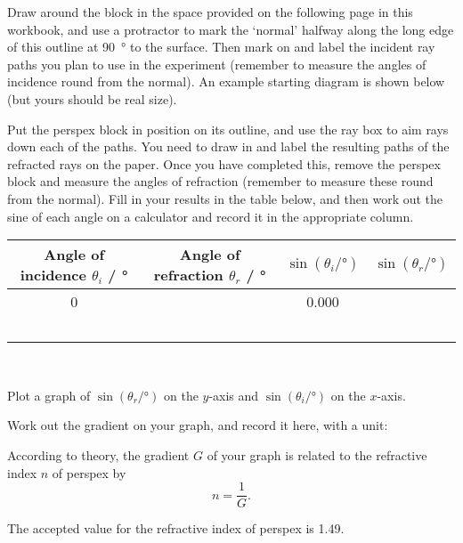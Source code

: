\begin{questions}
\question Draw around the block in the space provided on the following page in this workbook, and use a protractor to mark the `normal' halfway along the long edge of this outline at \SI{90}{\degree} to the surface.  Then mark on and label the incident ray paths you plan to use in the experiment (remember to measure the angles of incidence round from the normal).  An example starting diagram is shown below (but yours should be real size).

\hfill{}\hfill{}

\question Put the perspex block in position on its outline, and use the ray box to aim rays down each of the paths.  You need to draw in and label the resulting paths of the refracted rays on the paper.  Once you have completed this, remove the perspex block and measure the angles of refraction (remember to measure these round from the normal).  Fill in your results in the table below, and then work out the sine of each angle on a calculator and record it in the appropriate column.\\

\begin{tabular}{|c|c|c|c|}
\hline
Angle of incidence $\theta_{i}$ / \si{\degree} & Angle of refraction $\theta_{r}$ / \si{\degree} & $\sin(\theta_{i}/\si{\degree})$ & $\sin(\theta_{r}/\si{\degree})$ \\
\hline 
0&&0.000& \\
\hline
&&& \\
\hline
&&& \\
\hline
&&& \\
\hline
&&& \\
\hline
&&& \\
\hline
\end{tabular}\\

\newpage

\vspace*{\fill}

\question Plot a graph of $\sin(\theta_{r}/\si{\degree})$ on the $y$-axis and $\sin(\theta_{i}/\si{\degree})$ on the $x$-axis.

\question Work out the gradient on your graph, and record it here, with a unit: \answerline

According to theory, the gradient $G$ of your graph is related to the refractive index $n$ of perspex by
\[n=\frac{1}{G}.\]

The accepted value for the refractive index of perspex is 1.49.
\end{questions}

